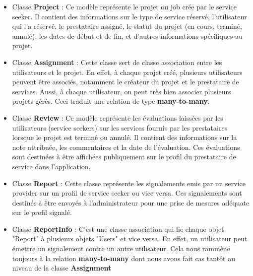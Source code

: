 \begin{itemize}

    \item Classe \textbf{Project} :  Ce modèle représente le projet ou job crée par le service seeker. Il contient des informations sur le type de service réservé, l'utilisateur qui l'a réservé, le prestataire assigné, le statut du projet (en cours, terminé, annulé), les dates de début et de fin, et d'autres informations spécifiques au projet.

    \item Classe \textbf{Assignment} : Cette classe sert de classe association entre les utilisateurs et le projet. En effet, à chaque projet créé, plusieurs utilisateurs peuvent être associés, notamment le créateur du projet et le prestataire de services. Aussi, à chaque utilisateur, on peut très bien associer plusieurs projets gérés. Ceci traduit une relation de type \textbf{many-to-many}. 

    \item Classe \textbf{Review} :  Ce modèle représente les évaluations laissées par les utilisateurs (service seekers) sur les services fournis par les prestataires lorsque le projet est terminé ou annulé. Il contient des informations sur la note attribuée, les commentaires et la date de l'évaluation. Ces évaluations sont destinées à être affichées publiquement sur le profil du prestataire de service dans l'application.

    \item Classe \textbf{Report} : Cette classe représente les signalements emis par un service provider sur un profil de service seeker ou vice versa. Ces signalements sont destinés à être envoyés à l'administrateur pour une prise de mesures adéquate sur le profil signalé. 

    \item Classe \textbf{ReportInfo} : C'est une classe association qui lie chaque objet "Report" à plusieurs objets "Users" et vice versa. En effet, un utilisateur peut émettre un signalement contre un autre utilisateur. Cela nous rammène toujours à la relation \textbf{many-to-many} dont nous avons fait cas tantôt au niveau de la classe \textbf{Assignment}
\end{itemize}

\vspace{0.35cm}

